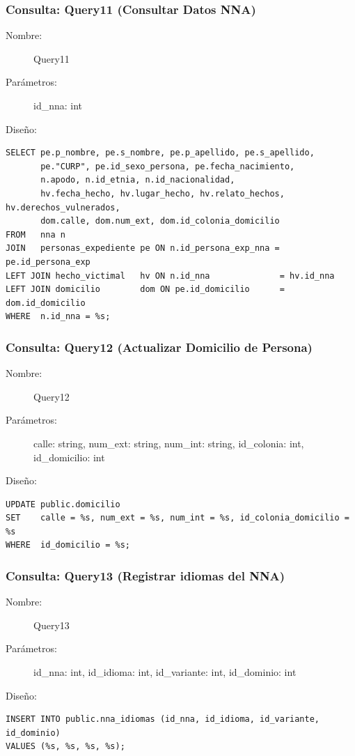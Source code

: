 \subsubsection{Consulta: Query11 (Consultar Datos NNA)}
\begin{description}
    \item[Nombre:] Query11
    \item[Parámetros:] id\_nna: int
    \item[Diseño:] \cdtEmpty
\end{description}
\begin{verbatim}
SELECT pe.p_nombre, pe.s_nombre, pe.p_apellido, pe.s_apellido, 
       pe."CURP", pe.id_sexo_persona, pe.fecha_nacimiento,
       n.apodo, n.id_etnia, n.id_nacionalidad,
       hv.fecha_hecho, hv.lugar_hecho, hv.relato_hechos, hv.derechos_vulnerados,
       dom.calle, dom.num_ext, dom.id_colonia_domicilio
FROM   nna n
JOIN   personas_expediente pe ON n.id_persona_exp_nna = pe.id_persona_exp
LEFT JOIN hecho_victimal   hv ON n.id_nna              = hv.id_nna
LEFT JOIN domicilio        dom ON pe.id_domicilio      = dom.id_domicilio
WHERE  n.id_nna = %s;
\end{verbatim}

\subsubsection{Consulta: Query12 (Actualizar Domicilio de Persona)}
\begin{description}
    \item[Nombre:] Query12
    \item[Parámetros:] calle: string, num\_ext: string, num\_int: string, id\_colonia: int, id\_domicilio: int
    \item[Diseño:] \cdtEmpty
\end{description}
\begin{verbatim}
UPDATE public.domicilio
SET    calle = %s, num_ext = %s, num_int = %s, id_colonia_domicilio = %s
WHERE  id_domicilio = %s;
\end{verbatim}

\subsubsection{Consulta: Query13 (Registrar idiomas del NNA)}
\begin{description}
    \item[Nombre:] Query13
    \item[Parámetros:] id\_nna: int, id\_idioma: int, id\_variante: int, id\_dominio: int
    \item[Diseño:] \cdtEmpty
\end{description}
\begin{verbatim}
INSERT INTO public.nna_idiomas (id_nna, id_idioma, id_variante, id_dominio)
VALUES (%s, %s, %s, %s);
\end{verbatim}

